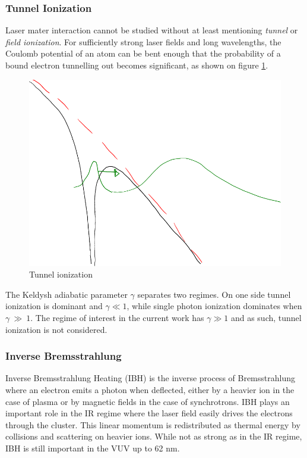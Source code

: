 \subsubsection{Tunnel Ionization}
Laser mater interaction cannot be studied without at least mentioning
\textit{tunnel} or \textit{field ionization}. For sufficiently strong laser
fields and long wavelengths, the Coulomb potential of an atom can be bent enough
that the probability of a bound electron tunnelling out becomes significant, as
shown on figure \ref{fig:ionization:tunnel}.

\begin{figure}
 \centering
 \includegraphics[width=0.76\columnwidth]{figures/mockups/ionization_tunnel}
 \caption{Tunnel ionization}
 \label{fig:ionization:tunnel}
\end{figure}

The Keldysh adiabatic parameter $\gamma$ separates two regimes\cite{Fennel2010}.
On one side tunnel ionization is dominant and $\gamma \ll 1$, while single
photon ionization dominates when $\gamma~\gg~1$. The regime of interest in the
current work has $\gamma \gg 1$ and as such, tunnel ionization is not
considered.


\subsubsection{Inverse Bremsstrahlung}
Inverse Bremsstrahlung Heating (IBH) is the inverse process of Bremsstrahlung
where an electron emits a photon when deflected, either by a heavier ion in the
case of plasma or by magnetic fields in the case of synchrotrons. IBH plays an
important role in the IR regime\cite{Fennel2010} where the laser field easily
drives the electrons through the cluster. This linear momentum is redistributed
as thermal energy by collisions and scattering on heavier ions. While not as
strong as in the IR regime, IBH is still important in the VUV\cite{Krainov2000}
up to 62 nm\cite{Georgescu2007}.





